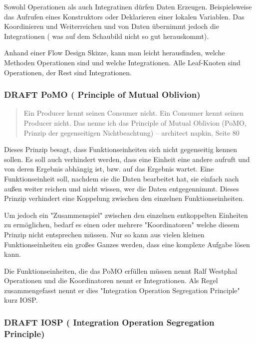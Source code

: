 \documentclass[11pt]{article}
\begin{document}
Sowohl Operationen als auch Integratinen dürfen Daten Erzeugen.
Beispielsweise das Aufrufen eines Konstruktors oder Deklarieren einer lokalen Variablen.
Das Koordinieren und Weiterreichen und von Daten übernimmt jedoch die Integrationen ( was auf dem Schaubild nicht so
gut herauskommt).

Anhand einer Flow Design Skizze, kann man leicht herausfinden, welche Methoden Operationen sind und welche
Integrationen.
Alle Leaf-Knoten sind Operationen, der Rest sind Integrationen.



\subsubsection{{\bfseries\sffamily DRAFT} PoMO ( Principle of Mutual Oblivion)}
\label{sec:orgheadline19}
\begin{quote}
Ein Producer kennt seinen Consumer nicht. Ein Consumer kennt seinen Producer
nicht. Das nenne ich das Principle of Mutual Oblivion (PoMO,
Prinzip der gegenseitigen Nichtbeachtung) -- architect napkin, Seite 80
\end{quote}

Dieses Prinzip besagt, dass Funktionseinheiten sich nicht gegenseitig kennen sollen.
Es soll auch verhindert werden, dass eine Einheit eine andere aufruft und von deren Ergebnis
abhängig ist, bzw. auf das Ergebnis wartet.
Eine Funktionseinheit soll, nachdem sie die Daten bearbeitet hat, sie einfach nach
außen weiter reichen und nicht wissen, wer die Daten entgegennimmt.
Dieses Prinzip verhindert eine Koppelung zwischen den einzelnen Funktionseinheiten.

Um jedoch ein "Zusammenspiel" zwischen den einzelnen entkoppelten Einheiten zu ermöglichen, bedarf es einen oder
mehrere "Koordinatoren" welche diesem Prinzip nicht entsprechen müssen.
Nur so kann aus vielen kleinen Funktionseinheiten ein großes Ganzes werden, dass eine komplexe Aufgabe lösen kann.

Die Funktionseinheiten, die das PoMO erfüllen müssen nennt Ralf Westphal Operationen und die Koordinatoren nennt er
Integrationen. Als Regel zusammengefasst nennt er dies "Integration Operation Segregation Principle" kurz IOSP.


\subsubsection{{\bfseries\sffamily DRAFT} IOSP ( Integration Operation Segregation Principle)}
\label{sec:orgheadline22}
\end{document}
